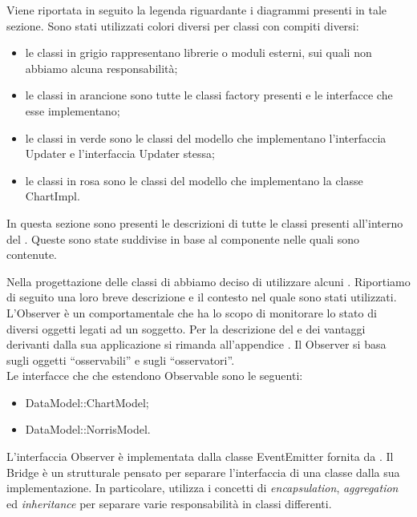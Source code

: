 		Viene riportata in seguito la legenda riguardante i diagrammi presenti in tale sezione. Sono stati utilizzati colori diversi per classi con compiti diversi:
		\begin{itemize}
			\item le classi in grigio rappresentano librerie o moduli esterni, sui quali non abbiamo alcuna responsabilità;
			\item le classi in arancione sono tutte le classi factory presenti e le interfacce che esse implementano;
			\item le classi in verde sono le classi del modello che implementano l'interfaccia Updater e l'interfaccia Updater stessa;
			\item le classi in rosa sono le classi del modello che implementano la classe ChartImpl.
		\end{itemize}
		In questa sezione sono presenti le descrizioni di tutte le classi presenti all'interno del  . Queste sono state suddivise in base al componente nelle quali sono contenute.
		
		
		
			Nella progettazione delle classi di  abbiamo deciso di utilizzare alcuni . Riportiamo di seguito una loro breve descrizione e il contesto nel quale sono stati utilizzati.
			L'Observer è un  comportamentale che ha lo scopo di monitorare lo stato di diversi oggetti legati ad un soggetto.
			Per la descrizione del  e dei vantaggi derivanti dalla sua applicazione si rimanda all'appendice .
				Il  Observer si basa sugli oggetti “osservabili” e sugli “osservatori”.\\
				Le interfacce che che estendono Observable sono le seguenti:
				\begin{itemize}
					\item DataModel::ChartModel;
					\item DataModel::NorrisModel.
				\end{itemize}
				L'interfaccia Observer è implementata dalla classe EventEmitter fornita da .
			Il Bridge è un  strutturale pensato per separare l'interfaccia di una classe dalla sua implementazione. In particolare, utilizza i concetti di \textit{encapsulation}, \textit{aggregation} ed \textit{inheritance} per separare varie responsabilità in classi differenti. \\
